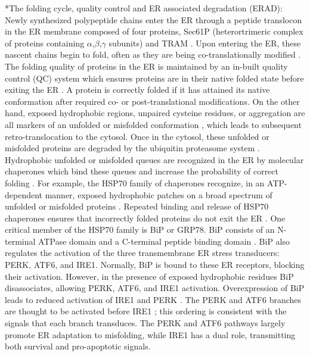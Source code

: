 \documentclass[12pt]{article}
\makeatletter
\renewcommand\subsection{\@startsection
	{subsection}{2}{0mm}
	{-0.05in}
	{-0.5\baselineskip}
	{\normalfont\normalsize\bfseries}}
\makeatother
\begin{document}
\subsection*{The folding cycle, quality control and ER associated degradation (ERAD):} 
Newly synthesized polypeptide chains enter the ER through a peptide translocon in the ER membrane composed of four proteins, Sec61P (heterortrimeric complex of proteins containing $\alpha$,$\beta$,$\gamma$ subunits) and TRAM \citep{Matlack:1998kx}. 
Upon entering the ER, these nascent chains begin to fold, often as they are being co-translationally modified \citep{Fedorov:1997ys}. The folding quality of proteins in the ER is maintained by an in-built quality control (QC) system which ensures proteins are in their native folded state before exiting the ER \citep{ellgaard1999ssq,ellgaard2003qce}. A protein is correctly folded if it has attained its native conformation after required co- or post-translational modifications. On the other hand, exposed hydrophobic regions, unpaired cysteine residues, or aggregation are all markers of an unfolded or misfolded conformation \citep{ellgaard1999ssq}, which leads to subsequent retro-translocation to the cytosol. Once in the cytosol, these unfolded or misfolded proteins are degraded by the ubiquitin proteasome system \citep{Hershko:2000kl}. Hydrophobic unfolded or misfolded queues are recognized in the ER by molecular chaperones which bind these queues and increase the probability of correct folding \citep{fra1993qce,helenius1997cca,hellman1999vab}. For example, the HSP70 family of chaperones recognize, in an ATP-dependent manner, exposed hydrophobic patches on a broad spectrum of unfolded or misfolded proteins \citep{kaufman2002unfolded}. Repeated binding and release of HSP70 chaperones ensures that incorrectly folded proteins do not exit the ER \citep{kaufman2002unfolded}. One critical member of the HSP70 family is BiP or GRP78. BiP consists of an N-terminal ATPase domain and a C-terminal peptide binding domain \citep{GETHING1999}. BiP also regulates the activation of the three transmembrane ER stress transducers: PERK, ATF6, and IRE1. Normally, BiP is bound to these ER receptors, blocking their activation. However, in the presence of exposed hydrophobic residues BiP disassociates, allowing PERK, ATF6, and IRE1 activation. Overexpression of BiP leads to reduced activation of IRE1 and PERK \citep{bertolotti2000dib,kohno1993pry}. The PERK and ATF6 branches are thought to be activated before IRE1 \citep{szegezdi2006mediators}; this ordering is consistent with the signals that each branch transduces. The PERK and ATF6 pathways largely promote ER adaptation to misfolding, while IRE1 has a dual role, transmitting both survival and pro-apoptotic signals.
\end{document}
